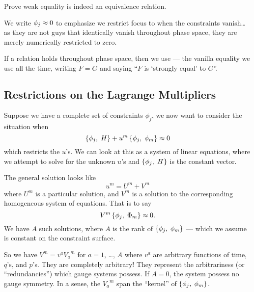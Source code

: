 \begin{xca}
  Prove weak equality is indeed an equivalence relation.
\end{xca}

\M
We write $\phi_{j}\approx0$ to emphasize we restrict focus to when the
constraints vanish\dots as they are not guys that identically vanish
throughout phase space, they are merely numerically restricted to zero.

\begin{definition}
If a relation holds throughout phase space, then we use
 --- the vanilla equality we use all the time,
writing $F=G$ and saying ``$F$ is `strongly equal' to $G$''.
\end{definition}

\subsection{Restrictions on the Lagrange Multipliers}\label{subsec:constrained-hamiltonian:restrictions-on-lagrange-multipliers}
Suppose we have a complete set of constraints $\phi_{j}$, we now want to
consider the situation when
\begin{equation}
\left\{\phi_{j},\;H\right\} + u^{m}\left\{\phi_{j},\;\phi_{m}\right\}\approx0
\end{equation}
which restricts the $u$'s. We can look at this as a system of linear
equations, where we attempt to solve for the unknown $u$'s and
$\left\{\phi_{j},\;H\right\}$ is the constant vector.

\label{n:constrained:generic-soln}
The general solution looks like
\begin{equation}
  u^{m} = U^{m} + V^{m}
\end{equation}
where $U^{m}$ is a particular solution, and $V^{m}$ is a solution to the
corresponding homogeneous system of equations. That is to say
\begin{equation}
V^{m}\left\{\phi_{j},\;\Phi_{m}\right\}\approx 0.
\end{equation}
We have $A$ such solutions, where $A$ is the rank of
$\left\{\phi_{j},\;\phi_{m}\right\}$ --- which we assume is constant on
the constraint surface.

So we have $V^{m}=v^{a}{V_{a}}^{m}$ for $a=1$, \dots, $A$ where $v^{a}$
are arbitrary functions of time, $q$'s, and $p$'s. They are completely
arbitrary! They represent the arbitrariness (or ``redundancies'') which
gauge systems possess. If $A=0$, the system possess no gauge
symmetry. In a sense, the ${V_{a}}^{m}$ span the ``kernel'' of
$\left\{\phi_{j},\;\phi_{m}\right\}$.

